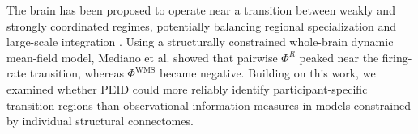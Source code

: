 \documentclass[fleqn,10pt]{wlscirep}
\newcommand{\rev}[1]{\textcolor{red}{#1}}
\theoremstyle{naturetheorem}
\begin{document}
The brain has been proposed to operate near a transition between weakly and strongly coordinated regimes, potentially balancing regional specialization and large-scale integration \cite{WilliamsGarcia2014Quasicritical,Toker2022Consciousness}. Using a structurally constrained whole-brain dynamic mean-field model, Mediano et al. \cite{Mediano2025TowardAU} showed that pairwise $\Phi^R$ peaked near the firing-rate transition, whereas $\Phi^{\mathrm{WMS}}$ became negative. Building on this work, we examined whether PEID could more reliably identify participant-specific transition regions than observational information measures in models constrained by individual structural connectomes.
\end{document}
